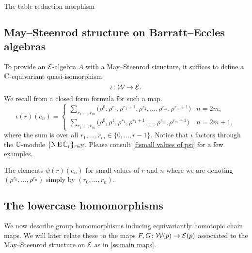 \sssec

The table reduction morphism \TBW

\subsection{May--Steenrod structure on Barratt--Eccles algebras}

To provide an $\mathcal{E}$-algebra $A$ with a May--Steenrod structure, it suffices to define a $\mathbb{C}$-equivariant quasi-isomorphism
\[
\iota \colon \mathcal{W} \to \mathcal{E}.
\]
We recall from \cite{medina2021may_st} a closed form formula for such a map.
\begin{equation*}
	\iota(r)(e_{n}) = \begin{cases}
		\displaystyle{\sum_{r_1, \dots, r_m}} \big(\rho^0, \rho^{r_1}, \rho^{r_1+1}, \rho^{r_2}, \dots, \rho^{r_{m}}, \rho^{r_{m}+1} \big) & n = 2m, \\
		\displaystyle{\sum_{r_1, \dots, r_m}} \big(\rho^0, \rho^1, \rho^{r_1}, \rho^{r_1+1}, \dots, \rho^{r_{m}}, \rho^{r_{m}+1} \big) & n = 2m+1,
	\end{cases}
\end{equation*}
where the sum is over all $r_1, \dots, r_m \in \{0, \dots, r-1\}$.
Notice that $\iota$ factors through the $\mathbb{C}$-module $\{\operatorname{N}\operatorname{E}\mathbb{C}_r\}_{r\in\mathbb{N}}$.
Please consult \cref{f:small values of psi} for a few examples.

\begin{table}
	\centering
	
	\caption{The elements $\psi(r)(e_n)$ for small values of $r$ and $n$ where we are denoting $(\rho^{r_0}, \dots, \rho^{r_n})$ simply by $(r_0, \dots, r_n)$.}
	\label{f:small values of psi}
\end{table}

\subsection{The lowercase homomorphisms}

We now describe group homomorphisms inducing equivariantly homotopic chain maps.
We will later relate these to the maps $F,G \colon \mathcal{W}(p) \to \mathcal{E}(p)$ associated to the May--Steenrod structure on $\mathcal{E}$ as in \cref{ss:main maps}.

\sssec

